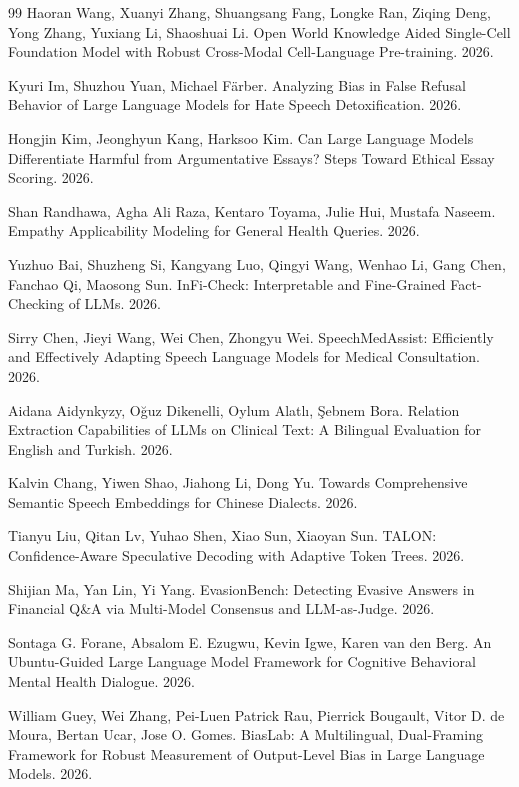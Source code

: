 \documentclass{article}
\begin{document}
\begin{thebibliography}{99}
Haoran Wang, Xuanyi Zhang, Shuangsang Fang, Longke Ran, Ziqing Deng, Yong Zhang, Yuxiang Li, Shaoshuai Li. Open World Knowledge Aided Single-Cell Foundation Model with Robust Cross-Modal Cell-Language Pre-training. 2026.

Kyuri Im, Shuzhou Yuan, Michael Färber. Analyzing Bias in False Refusal Behavior of Large Language Models for Hate Speech Detoxification. 2026.

Hongjin Kim, Jeonghyun Kang, Harksoo Kim. Can Large Language Models Differentiate Harmful from Argumentative Essays? Steps Toward Ethical Essay Scoring. 2026.

Shan Randhawa, Agha Ali Raza, Kentaro Toyama, Julie Hui, Mustafa Naseem. Empathy Applicability Modeling for General Health Queries. 2026.

Yuzhuo Bai, Shuzheng Si, Kangyang Luo, Qingyi Wang, Wenhao Li, Gang Chen, Fanchao Qi, Maosong Sun. InFi-Check: Interpretable and Fine-Grained Fact-Checking of LLMs. 2026.

Sirry Chen, Jieyi Wang, Wei Chen, Zhongyu Wei. SpeechMedAssist: Efficiently and Effectively Adapting Speech Language Models for Medical Consultation. 2026.

Aidana Aidynkyzy, Oğuz Dikenelli, Oylum Alatlı, Şebnem Bora. Relation Extraction Capabilities of LLMs on Clinical Text: A Bilingual Evaluation for English and Turkish. 2026.

Kalvin Chang, Yiwen Shao, Jiahong Li, Dong Yu. Towards Comprehensive Semantic Speech Embeddings for Chinese Dialects. 2026.

Tianyu Liu, Qitan Lv, Yuhao Shen, Xiao Sun, Xiaoyan Sun. TALON: Confidence-Aware Speculative Decoding with Adaptive Token Trees. 2026.

Shijian Ma, Yan Lin, Yi Yang. EvasionBench: Detecting Evasive Answers in Financial Q\&A via Multi-Model Consensus and LLM-as-Judge. 2026.

Sontaga G. Forane, Absalom E. Ezugwu, Kevin Igwe, Karen van den Berg. An Ubuntu-Guided Large Language Model Framework for Cognitive Behavioral Mental Health Dialogue. 2026.

William Guey, Wei Zhang, Pei-Luen Patrick Rau, Pierrick Bougault, Vitor D. de Moura, Bertan Ucar, Jose O. Gomes. BiasLab: A Multilingual, Dual-Framing Framework for Robust Measurement of Output-Level Bias in Large Language Models. 2026.

\end{thebibliography}
\end{document}
